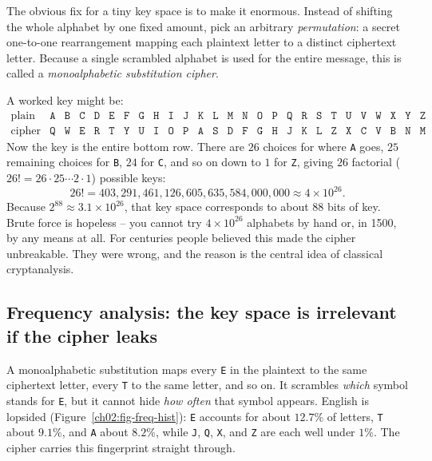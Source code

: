 The obvious fix for a tiny key space is to make it enormous. Instead of shifting the whole
alphabet by one fixed amount, pick an arbitrary \emph{permutation}: a secret one-to-one
rearrangement mapping each plaintext letter to a distinct ciphertext letter. Because a single
scrambled alphabet is used for the entire message, this is called a \emph{monoalphabetic
substitution cipher}.

A worked key might be:
\[
\begin{array}{c|cccccccccccccccccccccccccc}
\text{plain}  & \texttt{A}&\texttt{B}&\texttt{C}&\texttt{D}&\texttt{E}&\texttt{F}&\texttt{G}&\texttt{H}&\texttt{I}&\texttt{J}&\texttt{K}&\texttt{L}&\texttt{M}&\texttt{N}&\texttt{O}&\texttt{P}&\texttt{Q}&\texttt{R}&\texttt{S}&\texttt{T}&\texttt{U}&\texttt{V}&\texttt{W}&\texttt{X}&\texttt{Y}&\texttt{Z}\\
\text{cipher} & \texttt{Q}&\texttt{W}&\texttt{E}&\texttt{R}&\texttt{T}&\texttt{Y}&\texttt{U}&\texttt{I}&\texttt{O}&\texttt{P}&\texttt{A}&\texttt{S}&\texttt{D}&\texttt{F}&\texttt{G}&\texttt{H}&\texttt{J}&\texttt{K}&\texttt{L}&\texttt{Z}&\texttt{X}&\texttt{C}&\texttt{V}&\texttt{B}&\texttt{N}&\texttt{M}
\end{array}
\]
Now the key is the entire bottom row. There are $26$ choices for where \texttt{A} goes, $25$
remaining choices for \texttt{B}, $24$ for \texttt{C}, and so on down to $1$ for \texttt{Z},
giving $26$ factorial ($26! = 26 \cdot 25 \cdots 2 \cdot 1$) possible keys:
\[
  26! = 403{,}291{,}461{,}126{,}605{,}635{,}584{,}000{,}000 \approx 4 \times 10^{26}.
\]
Because $2^{88} \approx 3.1 \times 10^{26}$, that key space corresponds to about $88$ bits of
key. Brute force is hopeless -- you cannot try $4\times10^{26}$ alphabets by hand or, in
1500, by any means at all. For centuries people believed this made the cipher unbreakable.
They were wrong, and the reason is the central idea of classical cryptanalysis.

\subsection{Frequency analysis: the key space is irrelevant if the cipher leaks}

A monoalphabetic substitution maps every \texttt{E} in the plaintext to the
same ciphertext letter, every \texttt{T} to the same letter, and so on. It scrambles
\emph{which} symbol stands for \texttt{E}, but it cannot hide \emph{how often} that symbol
appears. English is lopsided (Figure~\ref{ch02:fig-freq-hist}): \texttt{E} accounts for about
$12.7\%$ of letters, \texttt{T} about $9.1\%$, and \texttt{A} about $8.2\%$, while \texttt{J},
\texttt{Q}, \texttt{X}, and \texttt{Z} are each well under $1\%$. The cipher carries this
fingerprint straight through.

